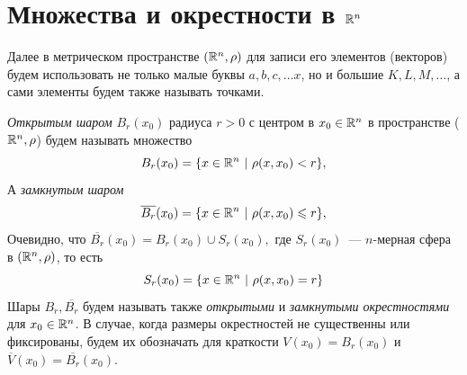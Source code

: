 \documentclass[../../main.tex]{subfiles}
\begin{document}
  
  \section{Множества и окрестности в $\mathbb{R}^n$}
  Далее в метрическом пространстве $(\mathbb{R}^n, \rho)$ для записи его 
  элементов (векторов) будем использовать не только малые буквы
  $a, b, c, \dots x$, но и большие $K, L, M, \dots$, а сами 
  элементы будем также называть точками.
  
  \emph{Открытым шаром} $B_r(x_0)$ радиуса $r > 0$ с центром в $x_0 \in 
  \mathbb{R}^n$ в пространстве ($\mathbb{R}^n, \rho$) будем называть множество 
  \[
  B_r(x_0) = \{x \in \mathbb{R}^n\ |\ \rho(x, x_0) < r\}, 
  \]
  А \emph{замкнутым шаром}
  \[
  \overline{B_r}(x_0) = \{x \in \mathbb{R}^n\ |\ \rho(x, x_0) \leqslant r\}, 
  \] 
  Очевидно, что $\overline{B_r}(x_0) = B_r(x_0) \cup S_r(x_0),$ где $ 
  S_r(x_0)$~--- $n$-мерная сфера в  $(\mathbb{R}^n, \rho)$, то есть 
  \[
  S_r(x_0) = \{x \in \mathbb{R}^n\ |\ \rho(x, x_0) = r\}
  \] 
  Шары $B_r, \overline{B_r}$ будем называть также \emph{открытыми} и 
  \emph{замкнутыми окрестностями} для $x_0 \in \mathbb{R}^n$. В случае, 
  когда размеры окрестностей не существенны или фиксированы, 
  будем их обозначать для краткости $V(x_0) = B_r(x_0)$ и 
  $\overline{V}(x_0) = \overline{B_r}(x_0)$.
  
\end{document}
